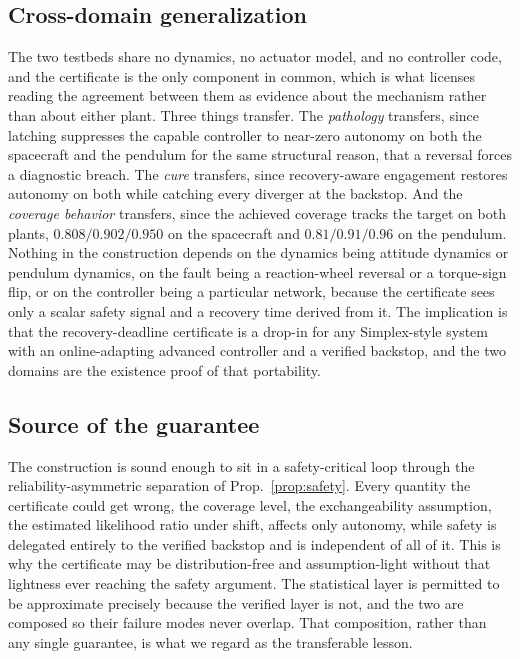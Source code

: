 \documentclass[11pt]{article}
\theoremstyle{plain}
\theoremstyle{definition}
\begin{document}
\subsection{Cross-domain generalization} The two testbeds share no dynamics, no
actuator model, and no controller code, and the certificate is the only component in common,
which is what licenses reading the agreement between them as evidence about the mechanism
rather than about either plant. Three things transfer. The \emph{pathology} transfers, since
latching suppresses the capable controller to near-zero autonomy on both the spacecraft and
the pendulum for the same structural reason, that a reversal forces a diagnostic breach. The
\emph{cure} transfers, since recovery-aware engagement restores autonomy on both while
catching every diverger at the backstop. And the \emph{coverage behavior} transfers, since
the achieved coverage tracks the target on both plants, $0.808/0.902/0.950$ on the spacecraft
and $0.81/0.91/0.96$ on the pendulum. Nothing in the construction depends on the dynamics
being attitude dynamics or pendulum dynamics, on the fault being a reaction-wheel reversal or
a torque-sign flip, or on the controller being a particular network, because the certificate
sees only a scalar safety signal and a recovery time derived from it. The implication is that
the recovery-deadline certificate is a drop-in for any Simplex-style system with an
online-adapting advanced controller and a verified backstop, and the two domains are the
existence proof of that portability.

\subsection{Source of the guarantee} The construction is sound enough to sit in a
safety-critical loop through the reliability-asymmetric separation of Prop.~\ref{prop:safety}.
Every quantity the certificate could get wrong, the coverage level, the exchangeability
assumption, the estimated likelihood ratio under shift, affects only autonomy, while safety is
delegated entirely to the verified backstop and is independent of all of it. This is why the
certificate may be distribution-free and assumption-light without that lightness ever reaching
the safety argument. The statistical layer is permitted to be approximate precisely because
the verified layer is not, and the two are composed so their failure modes never overlap. That
composition, rather than any single guarantee, is what we regard as the transferable lesson.
\end{document}
